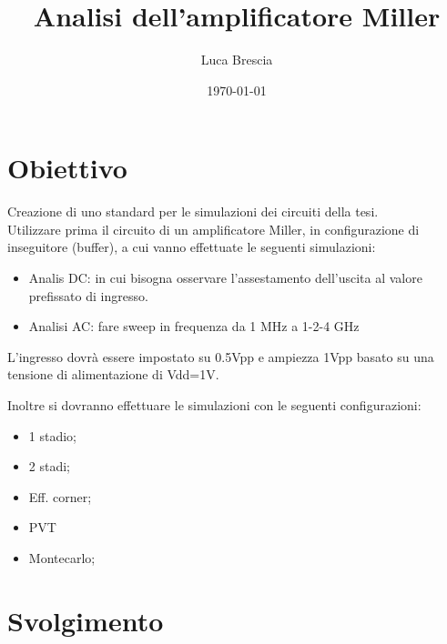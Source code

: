 \documentclass[a4paper]{article}
\begin{document}
    
    \title{Analisi dell'amplificatore Miller}
    \author{Luca Brescia}
    \date{\today}
    \maketitle

    \section*{Obiettivo}
        Creazione di uno standard per le simulazioni dei circuiti della tesi. \\
        Utilizzare prima il circuito di un amplificatore Miller, in configurazione di inseguitore (buffer), a cui vanno effettuate le seguenti simulazioni:

        \begin{itemize}
            \item Analis DC: in cui bisogna osservare l'assestamento dell'uscita al valore prefissato di ingresso.
            \item Analisi AC: fare sweep in frequenza da 1 MHz a 1-2-4 GHz
        \end{itemize}

        L'ingresso dovrà essere impostato su 0.5Vpp e ampiezza 1Vpp basato su una tensione di alimentazione di Vdd=1V.

        Inoltre si dovranno effettuare le simulazioni con le seguenti configurazioni:

        \begin{itemize}
            \item 1 stadio;
            \item 2 stadi;
            \item Eff. corner;
            \item PVT
            \item Montecarlo;
        \end{itemize}

    \section*{Svolgimento}
\end{document}
